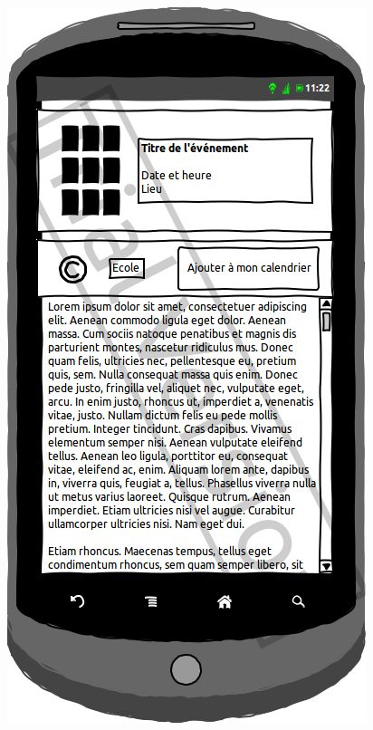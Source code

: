 \documentclass[a4paper, 11px]{article}
\begin{document}
\begin{figure}[htbp]
\begin{minipage}[c]{.50\linewidth}
\begin{center}
			\includegraphics[scale=0.3]{../../Sketch/Android/DescrEvent.png}
		\end{center}
	\end{minipage}
\end{figure}

\vfill
\clearpage
\end{document}
